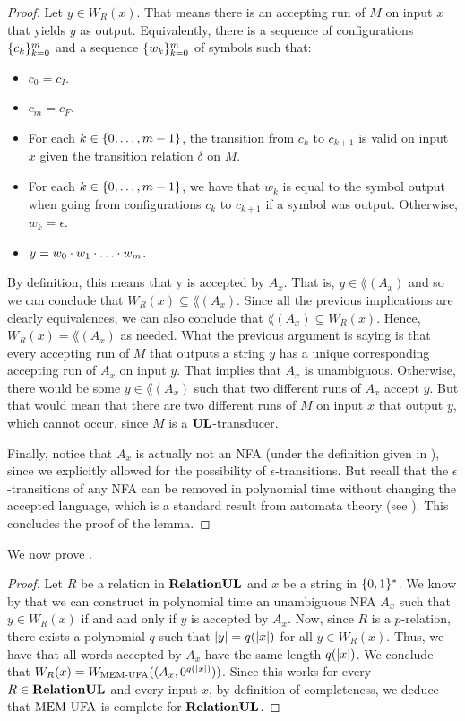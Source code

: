 \documentclass[11pt,twoside=off,numbers=noenddot]{scrbook}
\begin{document}
\begin{proof}
    Let $y \in W_R(x)$. That means there is an accepting run of $M$ on input $x$ that yields $y$ as output. Equivalently, there is a sequence of configurations $\{ c_k \}^{m}_{k = 0}$ and a sequence $\{ w_k \}^{m}_{k = 0}$ of symbols such that:
    \begin{itemize}
        \item $c_0 = c_I$.
        \item $c_m = c_F$.
        \item For each $k \in \{ 0, \dots, m - 1 \}$, the transition from $c_k$ to $c_{k + 1}$ is valid on input $x$ given the transition relation $\delta$ on $M$.
        \item For each $k \in \{ 0, \dots, m - 1 \}$, we have that $w_k$ is equal to the symbol output when going from configurations $c_k$ to $c_{k + 1}$ if a symbol was output. Otherwise, $w_k = \epsilon$.
        \item $y = w_0 \concat w_1 \concat \dots \concat w_m$.
    \end{itemize}
    By definition, this means that y is accepted by $A_x$. That is, $y \in \lang(A_x)$ and so we can conclude that $W_R(x) \subseteq \lang(A_x)$. Since all the previous implications are clearly equivalences, we can also conclude that $\lang(A_x) \subseteq W_R(x)$. Hence, $W_R(x) = \lang(A_x)$ as needed. What the previous argument is saying is that every accepting run of $M$ that outputs a string $y$ has a unique corresponding accepting run of $A_x$ on input $y$. That implies that $A_x$ is unambiguous. Otherwise, there would be some $y \in \lang(A_x)$ such that two different runs of $A_x$ accept $y$. But that would mean that there are two different runs of $M$ on input $x$ that output $y$, which cannot occur, since $M$ is a $\textbf{UL}$-transducer.

    Finally, notice that $A_x$ is actually not an NFA (under the definition given in ), since we explicitly allowed for the possibility of $\epsilon$-transitions. But recall that the $\epsilon$-transitions of any NFA can be removed in polynomial time without changing the accepted language, which is a standard result from automata theory (see \cite{hopcroft2001introduction}). This concludes the proof of the lemma.
\end{proof}

We now prove .

\begin{proof}
    Let $R$ be a relation in $\textbf{RelationUL}$ and $x$ be a string in $\{ 0, 1 \}^\ast$. We know by  that we can construct in polynomial time an unambiguous NFA $A_x$ such that $y \in W_R(x)$ if and and only if $y$ is accepted by $A_x$. Now, since $R$ is a $p$-relation, there exists a polynomial $q$ such that $| y | = q(| x |)$ for all $y \in W_R(x)$. Thus, we have that all words accepted by $A_x$ have the same length $q(| x |)$. We conclude that $W_R(x) = W_{\text{MEM-UFA}}((A_x, 0^{q(| x |)}))$. Since this works for every $R \in \textbf{RelationUL}$ and every input $x$, by definition of completeness, we deduce that $\text{MEM-UFA}$ is complete for $\textbf{RelationUL}$.
\end{proof}
\end{document}
